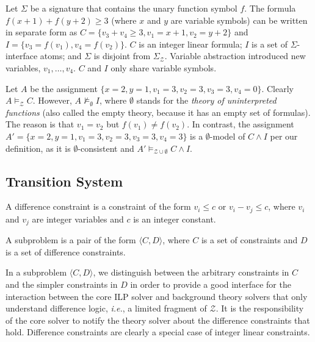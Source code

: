 \documentclass{llncs}
\newcommand{\ie}[0]{\emph{i.e.}, }
\newcommand{\subp}[2]{\ensuremath{\langle#1, #2\rangle}}
\newcommand{\Z}[0]{\ensuremath{\mathcal{Z}}}
\newcommand{\SigmaZ}[0]{\ensuremath{\Sigma_{\mathcal{Z}}}}
\newcommand{\modelsz}[0]{\ensuremath{ \models_{\Z} }}
\newcommand{\cd}{\subp{C}{D}}
\begin{document}
\begin{example}
  Let $\Sigma$ be a signature that contains the unary function symbol
  $f$. The formula $f(x + 1) + f(y + 2) \geq 3$ (where $x$ and $y$ are
  variable symbols) can be written in separate form as $C = \{ v_3 +
  v_4 \geq 3, v_1 = x + 1, v_2 = y + 2 \}$ and $I = \{ v_3 =
  f(v_1), v_4 = f(v_2) \}$. $C$ is an integer linear formula; $I$ is a
  set of $\Sigma$-interface atoms; and $\Sigma$ is disjoint from
  \SigmaZ{}. Variable abstraction introduced new variables, $v_{1},
  \ldots, v_4$. $C$ and $I$ only share variable symbols.

  Let $A$ be the assignment $\{x = 2, y = 1, v_1 = 3, v_2 = 3, v_3 =
  3, v_4 = 0\}$. Clearly $A \modelsz C$. However, $A \not
  \models_\emptyset I$, where $\emptyset$ stands for the \emph{theory
    of uninterpreted functions} (also called the empty theory, because
  it has an empty set of formulas). The reason is that $v_1 = v_2$ but
  $f(v_1) \neq f(v_2)$. In contrast, the assignment $A' = \{x = 2, y =
  1, v_1 = 3, v_2 = 3, v_3 = 3, v_4 = 3\}$ is a $\emptyset$-model of
  $C \wedge I$ per our definition, as it is $\emptyset$-consistent and
  $A' \models_{\Z{} \cup \emptyset} C \wedge I$.
\label{ex:abstraction}
\end{example}

\subsection{Transition System}

\begin{definition}
  A difference constraint is a constraint of the form $v_i \leq c$ or
  $v_i - v_j \leq c$, where $v_i$ and $v_j$ are integer variables and
  $c$ is an integer constant.
\end{definition}

\begin{definition}[Subproblem]
  A subproblem is a pair of the form \cd{}, where $C$ is a set of
  constraints and $D$ is a set of difference constraints.
\end{definition}

In a subproblem \cd{}, we distinguish between the arbitrary
constraints in $C$ and the simpler constraints in $D$ in order to
provide a good interface for the interaction between the core ILP
solver and background theory solvers that only understand difference
logic, \ie a limited fragment of $\Z$. It is the responsibility of the
core solver to notify the theory solver about the difference
constraints that hold. Difference constraints are clearly a special
case of integer linear constraints.
\end{document}
